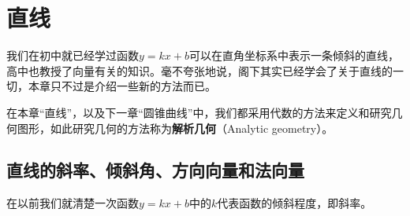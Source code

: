 \chapter{直线}
我们在初中就已经学过函数$y=kx+b$可以在直角坐标系中表示一条倾斜的直线，高中也教授了向量有关的知识。毫不夸张地说，阁下其实已经学会了关于直线的一切，本章只不过是介绍一些新的方法而已。

在本章“直线”，以及下一章“圆锥曲线”中，我们都采用代数的方法来定义和研究几何图形，如此研究几何的方法称为\textbf{解析几何}（Analytic geometry）。

\section[描述直线的斜率]{直线的斜率、倾斜角、方向向量和法向量}
在以前我们就清楚一次函数$y=kx+b$中的$k$代表函数的倾斜程度，即斜率。
